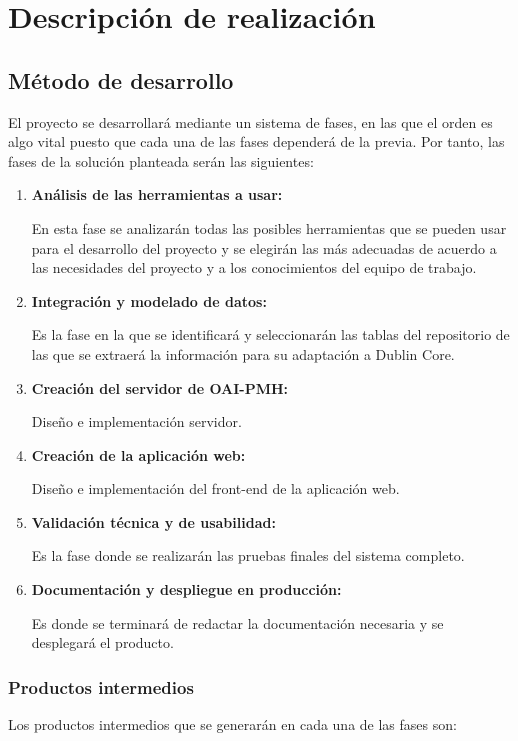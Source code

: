 \chapter{Descripción de realización}

\section{Método de desarrollo}

El proyecto se desarrollará mediante un sistema de fases, en las que el orden es algo vital puesto que cada una de las fases dependerá de la previa. Por tanto, las fases de la solución planteada serán las siguientes:

\begin{enumerate}
	\item \textbf{Análisis de las herramientas a usar:}

	En esta fase se analizarán todas las posibles herramientas que se pueden usar para el desarrollo del proyecto y se elegirán las más adecuadas de acuerdo a las necesidades del proyecto y a los conocimientos del equipo de trabajo.
	\item \textbf{Integración y modelado de datos:}

	Es la fase en la que se identificará y seleccionarán las tablas del repositorio de las que se extraerá la información para su adaptación a Dublin Core.
	\item \textbf{Creación del servidor de OAI-PMH:}

	Diseño e implementación servidor.
	\item \textbf{Creación de la aplicación web:}

	Diseño e implementación del front-end de la aplicación web. 
	\item \textbf{Validación técnica y de usabilidad:}

	Es la fase donde se realizarán las pruebas finales del sistema completo.
	\item \textbf{Documentación y despliegue en producción:}

	Es donde se terminará de redactar la documentación necesaria y se desplegará el producto.
\end{enumerate}

\subsection{Productos intermedios}

Los productos intermedios que se generarán en cada una de las fases son:

